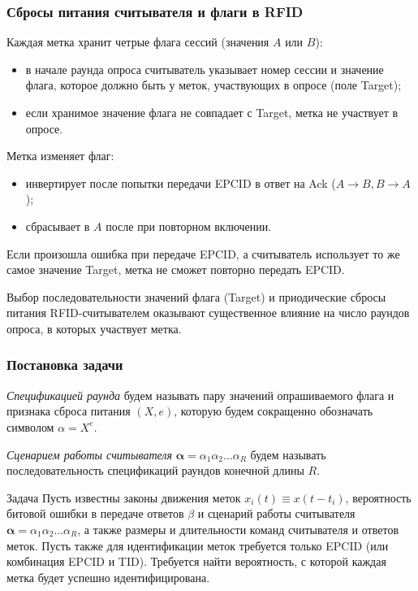 \begin{frame}
    \frametitle{Сбросы питания считывателя и флаги в RFID}
    Каждая метка хранит четрые флага сессий (значения $A$ или $B$):
    \small
    \begin{itemize}
        \item в начале раунда опроса считыватель указывает номер сессии и значение флага, которое должно быть у меток, участвующих в опросе (поле Target);
        \item если хранимое значение флага не совпадает с Target, метка не участвует в опросе.
    \end{itemize}
    \vfill
    Метка изменяет флаг:
    \small
    \begin{itemize}
        \item инвертирует после попытки передачи EPCID в ответ на Ack ($A \rightarrow B, B \rightarrow A$);
        \item сбрасывает в $A$ после при повторном включении.
    \end{itemize}
    \vfill
    Если произошла ошибка при передаче EPCID, а считыватель использует то же самое значение Target, метка не сможет повторно передать EPCID.
    \begin{block}{}
        Выбор последовательности значений флага (Target) и приодические сбросы питания RFID-считывателем оказывают существенное влияние на число раундов опроса, в которых участвует метка.
    \end{block}
\end{frame}

\begin{frame}
    \frametitle{Постановка задачи}

    \begin{block}{}
    \textit{Спецификацией раунда} будем называть пару значений опрашиваемого флага и признака сброса питания $(X, e)$, которую будем сокращенно обозначать символом $\alpha = X^{e}$.
    \end{block}

    \begin{block}{}
    \textit{Сценарием работы считывателя} $\bm{\alpha} = \alpha_1 \alpha_2 \dots \alpha_R$ будем называть последовательность спецификаций раундов конечной длины $R$.
    \end{block}

    \begin{alertblock}{Задача}
        Пусть известны законы движения меток $x_i(t) \equiv x(t - t_i)$, вероятность битовой ошибки в передаче ответов $\beta$ и сценарий работы считывателя $\bm{\alpha} = \alpha_1 \alpha_2 \dots \alpha_R$, а также размеры и длительности команд считывателя и ответов меток. Пусть также для идентификации меток требуется только EPCID (или комбинация EPCID и TID). Требуется найти вероятность, с которой каждая метка будет успешно идентифицирована.
    \end{alertblock}
\end{frame}

